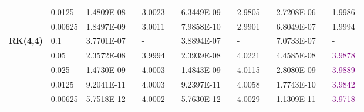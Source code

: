 \documentclass[aspectratio=169]{beamer}
\numberwithin{theorem}{section} %
\numberwithin{equation}{section}%
\numberwithin{figure}{section}%
\numberwithin{table}{section}%
\begin{document}
\begin{frame}
\begin{table}[H]
\begin{tabular}{lllllrlrlrlrlrl}
		\multicolumn{2}{l}{} & \multicolumn{2}{l}{0.0125} & 1.4809E-08 &       & 3.0023  &       & 6.3449E-09 &       & 2.9805  &       & 2.7208E-06 &       & 1.9986  \\
		\multicolumn{2}{l}{} & \multicolumn{2}{l}{0.00625} & 1.8497E-09 &       & 3.0011  &       & 7.9858E-10 &       & 2.9901  &       & 6.8049E-07 &       & 1.9994  \\
		\multicolumn{2}{l}{\multirow{5}[1]{*}{\textbf{RK(4,4)}}} & \multicolumn{2}{l}{0.1} & 3.7701E-07 &       & -     &       & 3.8894E-07 &       & -     &       & 7.0733E-07 &       & - \\
		\multicolumn{2}{l}{} & \multicolumn{2}{l}{0.05} & 2.3572E-08 &       & 3.9994  &       & 2.3939E-08 &       & 4.0221  &       & 4.4585E-08 &       & \textcolor{purple}{3.9878}  \\
		\multicolumn{2}{l}{} & \multicolumn{2}{l}{0.025} & 1.4730E-09 &       & 4.0003  &       & 1.4843E-09 &       & 4.0115  &       & 2.8080E-09 &       & \textcolor{purple}{3.9889}  \\
		\multicolumn{2}{l}{} & \multicolumn{2}{l}{0.0125} & 9.2041E-11 &       & 4.0003  &       & 9.2397E-11 &       & 4.0058  &       & 1.7743E-10 &       & \textcolor{purple}{3.9842}  \\
		\multicolumn{2}{l}{} & \multicolumn{2}{l}{0.00625} & 5.7518E-12 &       & 4.0002  &       & 5.7630E-12 &       & 4.0029  &       & 1.1309E-11 &       & \textcolor{purple}{3.9718}  \\
		\bottomrule
		\end{tabular}%
		\label{tab_SAVRRK:6-1}%
		\end{table}%
\end{frame}
\end{document}
